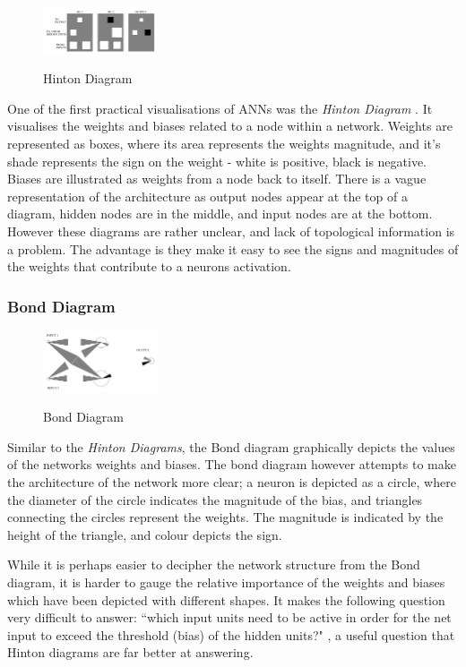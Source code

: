 \documentclass[a4paper,11pt,titlepage]{article}
\begin{document}
 	\begin{figure}[H]
    			\centering	
			{{\includegraphics[width=0.3\textwidth]
    				{img/craven_hinton.png} 
    			}}%
    			\caption{Hinton Diagram}%
    		\label{fig:simple}
	\end{figure} 
 		
		One of the first practical visualisations of ANNs was the \textit{Hinton Diagram} \cite{Hinton1986}. It visualises the weights and biases related to a node within a network. Weights are represented as boxes, where its area represents the weights magnitude, and it's shade represents the sign on the weight - white is positive, black is negative. Biases are illustrated as weights from a node back to itself. There is a vague representation of the architecture as output nodes appear at the top of a diagram, hidden nodes are in the middle, and input nodes are at the bottom. However these diagrams are rather unclear, and lack of topological information is a problem. The advantage is they make it easy to see the signs and magnitudes of the weights that contribute to a neurons activation.
		\par 
		
		\subsubsection{Bond Diagram} 
 		
 	\begin{figure}[H]
    			\centering	
			{{\includegraphics[width=0.3\textwidth]
    				{img/craven_bond.png} 
    			}}%
    			\caption{Bond Diagram}%
    		\label{fig:bond}
	\end{figure} 
 		
		Similar to the \textit{Hinton Diagrams}, the Bond diagram \cite{Wejchert1990} graphically depicts the values of the networks weights and biases. The bond diagram however attempts to make the architecture of the network more clear; a neuron is depicted as a circle, where the diameter of the circle indicates the magnitude of the bias, and triangles connecting the circles represent the weights. The magnitude is indicated by the height of the triangle, and colour depicts the sign. 
		\par 
		While it is perhaps easier to decipher the network structure from the Bond diagram, it is harder to gauge the relative importance of the weights and biases which have been depicted with different shapes. It makes the following question very difficult to answer: ``which input units need to be active in order for the net input to exceed the threshold (bias) of the hidden units?" \cite{Craven1992}, a useful question that Hinton diagrams are far better at answering.
		\par 
		
\end{document}
